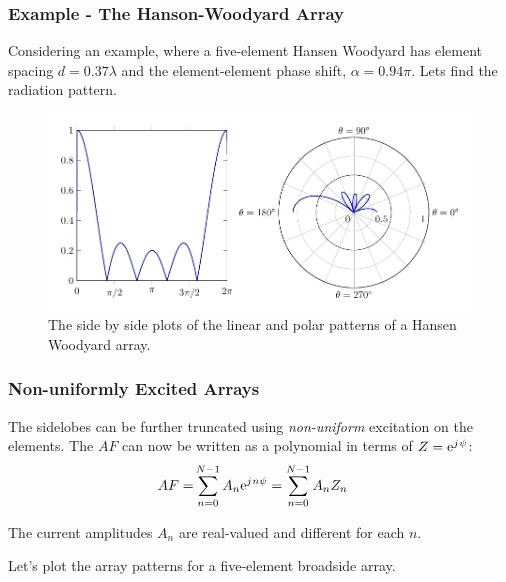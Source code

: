 \documentclass[10pt]{beamer}
\newcommand{\e}{\mathrm{e}} %
\renewcommand{\j}{{j}\mkern1mu} %
\begin{document}
\begin{frame}
    \frametitle{Example - The Hanson-Woodyard Array}
Considering an example, where a five-element Hansen Woodyard has element spacing $d  = 0.37 \lambda$ and the element-element phase shift, $\alpha = 0.94 \pi$. Lets find the radiation pattern.

\begin{figure}[h!]
    \centering
    \includegraphics[width = .9 \textwidth]{Hansen Woodyard.pdf}
    \caption{The side by side plots of the linear and polar patterns of a Hansen Woodyard array.}
\end{figure}
\end{frame}


\begin{frame}
    \frametitle{Non-uniformly Excited Arrays}
The sidelobes can be further truncated using \textit{non-uniform} excitation on the elements. The $AF$ can now be written as a polynomial in terms of $Z = \e^{\j \psi}$:
\begin{align*}
    AF {}=& \sum_{n = 0}^{N-1} A_n \e^{\j n \psi} = \sum_{n = 0}^{N-1} A_n Z_n
\end{align*}

The current amplitudes $A_n$ are real-valued and different for each $n$.

Let's plot the array patterns for a five-element broadside array.

\end{frame}
\end{document}
